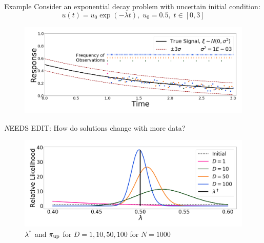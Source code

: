 \begin{block}{Example}
\centering
    Consider an exponential decay problem with uncertain initial condition:
   \begin{equation*}
       u(t) = u_0\exp(-\lambda t), \; u_0 = 0.5 ,\; t\in[0,3]
   \end{equation*}
\vspace{-0.5cm}
    \begin{figure}
        \includegraphics[width=26cm]{figures/exponential_decay_response_sigma-10E-4}
    \end{figure}


\vspace{1cm}

\centering
{}
{\emph NEEDS EDIT: How do solutions change with more data?}
\vspace{-0.5cm}
    \begin{figure}
        \includegraphics[width=26cm]{figures/updated_convergence_sigma-10E-4}
        \vspace{-0.5cm}
        \caption{ $\operatorname*{\lambda}^\dagger$ and $\operatorname*{\pi_{up}}$ for $D=1, 10, 50, 100$ for $N=1000$}
    \end{figure}



\end{block}
